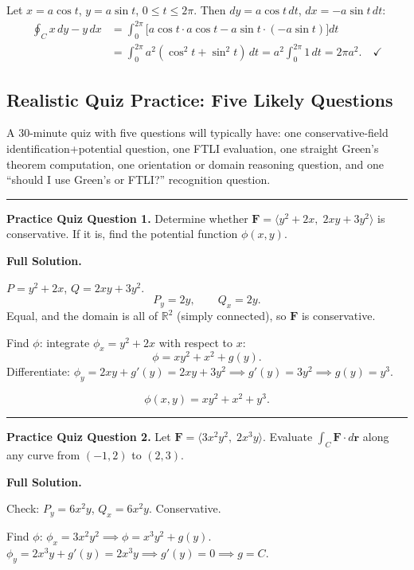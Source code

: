 \documentclass[11pt]{article}
\begin{document}
Let $x = a\cos t$, $y = a\sin t$, $0\le t\le 2\pi$. Then $dy = a\cos t\,dt$, $dx = -a\sin t\,dt$:
\begin{align*}
  \oint_C x\,dy - y\,dx
  &= \int_0^{2\pi}\bigl[a\cos t\cdot a\cos t - a\sin t\cdot(-a\sin t)\bigr]dt \\
  &= \int_0^{2\pi} a^2(\cos^2 t + \sin^2 t)\,dt
   = a^2\int_0^{2\pi} 1\,dt = 2\pi a^2.\quad\checkmark
\end{align*}

\subsection{Realistic Quiz Practice: Five Likely Questions}

A 30-minute quiz with five questions will typically have:
one conservative-field identification+potential question, one FTLI evaluation, one straight Green's theorem computation, one orientation or domain reasoning question, and one ``should I use Green's or FTLI?'' recognition question.

\bigskip
\hrule
\bigskip

\textbf{Practice Quiz Question 1.} Determine whether
$\mathbf{F} = \langle y^2 + 2x,\; 2xy + 3y^2 \rangle$
is conservative. If it is, find the potential function $\phi(x,y)$.

\textbf{Full Solution.}

$P = y^2 + 2x$, $Q = 2xy + 3y^2$.
\[
  P_y = 2y, \qquad Q_x = 2y.
\]
Equal, and the domain is all of $\mathbb{R}^2$ (simply connected), so $\mathbf{F}$ is conservative.

Find $\phi$: integrate $\phi_x = y^2 + 2x$ with respect to $x$:
\[
  \phi = xy^2 + x^2 + g(y).
\]
Differentiate: $\phi_y = 2xy + g'(y) = 2xy + 3y^2 \implies g'(y) = 3y^2 \implies g(y) = y^3$.

\[
  \boxed{\phi(x,y) = xy^2 + x^2 + y^3.}
\]

\bigskip
\hrule
\bigskip

\textbf{Practice Quiz Question 2.} Let $\mathbf{F} = \langle 3x^2 y^2,\; 2x^3 y \rangle$. Evaluate $\int_C \mathbf{F}\cdot d\mathbf{r}$ along any curve from $(-1, 2)$ to $(2, 3)$.

\textbf{Full Solution.}

Check: $P_y = 6x^2 y$, $Q_x = 6x^2 y$. Conservative.

Find $\phi$: $\phi_x = 3x^2 y^2 \implies \phi = x^3 y^2 + g(y)$.
$\phi_y = 2x^3 y + g'(y) = 2x^3 y \implies g'(y) = 0 \implies g = C$.
\end{document}

